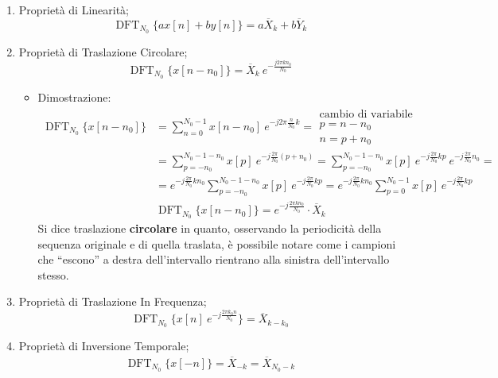 \documentclass[
]{article}
\providecommand{\tightlist}{%
  \setlength{\itemsep}{0pt}\setlength{\parskip}{0pt}}
\begin{document}
\begin{enumerate}
\def\labelenumi{\arabic{enumi}.}
\setcounter{enumi}{15}
\item
  Proprietà di Linearità; \[
  \operatorname{DFT}_{N_0}\Big\{ax[n]+by[n]\Big\} = a\overline{X}_k + b\overline{Y}_k
  \]
\item
  Proprietà di Traslazione Circolare; \[
  \operatorname{DFT}_{N_0}\Big\{ x[n-n_0] \Big\} = \overline{X}_k \ e^{-\frac{j2\pi kn_0}{N_0}}
  \]

  \begin{itemize}
  \tightlist
  \item
    Dimostrazione: \begin{align*}
    \operatorname{DFT}_{N_0}\Big\{ x[n-n_0] \Big\} &= \sum_{n=0}^{N_0 -1} x[n-n_0] \ e^{-j2\pi\frac{n}{N_0}k} =
    \boxed{
    \begin{array}{cl}
    \text{cambio di variabile} \\
    p  = n - n_0 \\
    n  = p + n_0
    \end{array}} \\
    &= \sum_{p=-n_0}^{N_0 - 1 - n_0} x[p] \ e^{-j\frac{2\pi}{N_0}(p+n_0)} = \sum_{p=-n_0}^{N_0 - 1 - n_0} x[p] \ e^{-j\frac{2\pi}{N_0}kp} \ e^{-j\frac{2\pi}{N_0}n_0}=\\
    &= e^{-j\frac{2\pi}{N_0}kn_0} \sum_{p=-n_0}^{N_0 - 1 - n_0} x[p] \ e^{-j\frac{2\pi}{N_0}kp} = e^{-j\frac{2\pi}{N_0}kn_0} \sum_{p=0}^{N_0 - 1} x[p] \ e^{-j\frac{2\pi}{N_0}kp} \\
    &\operatorname{DFT}_{N_0}\Big\{ x[n-n_0] \Big\} = e^{-j\frac{2\pi kn_0}{N_0}} \cdot \overline{X}_k &
    \end{align*} Si dice traslazione \textbf{circolare} in quanto,
    osservando la periodicità della sequenza originale e di quella
    traslata, è possibile notare come i campioni che ``escono'' a destra
    dell'intervallo rientrano alla sinistra dell'intervallo stesso.
  \end{itemize}
\item
  Proprietà di Traslazione In Frequenza; \[
  \operatorname{DFT}_{N_0}\Big\{ x[n] \ e^{-j\frac{2\pi k_0 n}{N_0}} \Big\} = \overline{X}_{k-k_0}
  \]
\item
  Proprietà di Inversione Temporale; \begin{gather*}
  \operatorname{DFT}_{N_0}\Big\{ x[-n] \Big\} = \overline{X}_{-k} = \overline{X}_{N_0 - k} 
  \end{gather*}


\end{enumerate}
\end{document}

